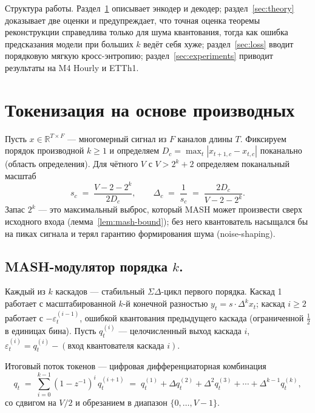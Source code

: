 \documentclass[11pt]{article}
\theoremstyle{remark}
\begin{document}
Структура работы. Раздел~\ref{sec:encoder} описывает энкодер и декодер;
раздел~\ref{sec:theory} доказывает две оценки и предупреждает, что
точная оценка теоремы реконструкции справедлива только для шума
квантования, тогда как ошибка предсказания модели при больших $k$
ведёт себя хуже; раздел~\ref{sec:loss} вводит порядковую мягкую
кросс-энтропию; раздел~\ref{sec:experiments} приводит результаты на M4
Hourly и ETTh1.

\section{Токенизация на основе производных}
\label{sec:encoder}

Пусть $x \in \mathbb{R}^{T \times F}$ --- многомерный сигнал из $F$
каналов длины $T$. Фиксируем порядок производной $k \ge 1$ и
определяем $D_c = \max_{t} |x_{t+1,c} - x_{t,c}|$ поканально (область
определения). Для чётного $V$ с $V > 2^k + 2$ определяем поканальный
масштаб
\begin{equation}
s_c \;=\; \frac{V - 2 - 2^k}{2 D_c}, \qquad \Delta_c \;=\; \frac{1}{s_c} \;=\; \frac{2 D_c}{V - 2 - 2^k}.
\end{equation}
Запас $2^k$ --- это максимальный выброс, который MASH может
произвести сверх исходного входа (лемма~\ref{lem:mash-bound}); без
него квантователь насыщался бы на пиках сигнала и терял гарантию
формирования шума (noise-shaping).

\subsection{MASH-модулятор порядка $k$.}
Каждый из $k$ каскадов --- стабильный $\Sigma\Delta$-цикл первого
порядка. Каскад 1 работает с масштабированной $k$-й конечной разностью
$y_t = s \cdot \Delta^k x_t$; каскад $i \ge 2$ работает с
$-\varepsilon^{(i-1)}_t$, ошибкой квантования предыдущего каскада
(ограниченной $\tfrac{1}{2}$ в единицах бина). Пусть $q^{(i)}_t$ ---
целочисленный выход каскада $i$, $\varepsilon^{(i)}_t = q^{(i)}_t -
(\text{вход квантователя каскада $i$})$.

Итоговый поток токенов --- цифровая дифференциаторная комбинация
\begin{equation}
q_t \;=\; \sum_{i=0}^{k-1} (1 - z^{-1})^i \, q^{(i+1)}_t \;=\;
           q^{(1)}_t + \Delta q^{(2)}_t + \Delta^2 q^{(3)}_t + \cdots
           + \Delta^{k-1} q^{(k)}_t,
\label{eq:mash-combined}
\end{equation}
со сдвигом на $V/2$ и обрезанием в диапазон $\{0, \dots, V-1\}$.
\end{document}
